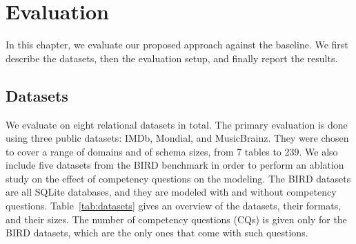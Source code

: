 \section{Evaluation}\label{sec:experiments}

In this chapter, we evaluate our proposed approach against the baseline. We first describe the datasets, then the evaluation setup, and finally report the results.


\subsection{Datasets}\label{sec:datasets}
We evaluate on eight relational datasets in total. The primary evaluation is done using three public datasets: IMDb, Mondial, and MusicBrainz. They were chosen to cover a range of domains and of schema sizes, from 7 tables to 239. We also include five datasets from the BIRD benchmark \citep{li2023bird} in order to perform an ablation study on the effect of competency questions on the modeling. The BIRD datasets are all SQLite databases, and they are modeled with and without competency questions. 
Table~\ref{tab:datasets} gives an overview of the datasets, their formats, and their sizes. The number of competency questions (CQs) is given only for the BIRD datasets, which are the only ones that come with such questions.

